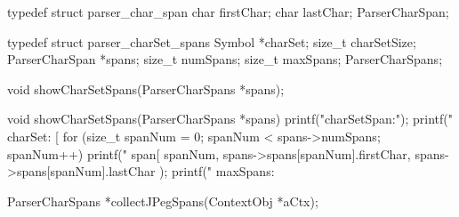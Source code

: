 
\startCHeader
typedef struct parser_char_span {
  char firstChar;
  char lastChar;
} ParserCharSpan;

typedef struct parser_charSet_spans {
  Symbol         *charSet;
  size_t          charSetSize;
  ParserCharSpan *spans;
  size_t          numSpans;
  size_t          maxSpans;
} ParserCharSpans;
\stopCHeader

\startCHeader
void showCharSetSpans(ParserCharSpans *spans);
\stopCHeader

\startCCode
void showCharSetSpans(ParserCharSpans *spans){
  printf("charSetSpan:\n");
  printf("  charSet: [%
  for (size_t spanNum = 0; spanNum < spans->numSpans; spanNum++) {
    printf("  span[%
      spanNum,
      spans->spans[spanNum].firstChar,
      spans->spans[spanNum].lastChar
    );
  }
  printf("  maxSpans: %
}
\stopCCode

\startCHeader
ParserCharSpans *collectJPegSpans(ContextObj *aCtx);
\stopCHeader

